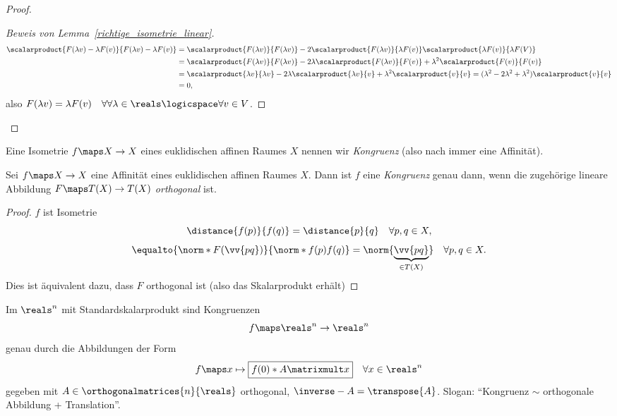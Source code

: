 \begin{proof}
\begin{proof}[Beweis von Lemma~\ref{richtige_isometrie_linear}]
    \begin{align*}
      \scalarproduct{F(\lambda v)-\lambda F(v)}{F(\lambda v)-\lambda F(v)}&=\scalarproduct{F(\lambda v)}{F(\lambda v)}-2\scalarproduct{F(\lambda v)}{\lambda F(v)}\scalarproduct{\lambda F(v)}{\lambda F(V)}\\
      &=\scalarproduct{F(\lambda v)}{F(\lambda v)}-2\lambda \scalarproduct{F(\lambda v)}{F(v)}+\lambda^2\scalarproduct{F(v)}{F(v)}\\
      &=\scalarproduct{\lambda v}{\lambda v}-2\lambda \scalarproduct{\lambda v}{v}+\lambda^2\scalarproduct{v}{v}=(\lambda^2-2\lambda^2+\lambda^2)\scalarproduct{v}{v}\\
      &=0,
    \end{align*}
    also \( F(\lambda v)=\lambda F(v)\quad  \forall \forall \lambda\in\reals\logicspace \forall v\in V \).
  \end{proof}
\end{proof}
\begin{definition*}
  Eine Isometrie \( f\maps X\to X \) eines euklidischen affinen Raumes \( X \) nennen wir \emph{Kongruenz} (also nach  immer eine Affinität).
\end{definition*}
\begin{lemma}
  Sei \( f\maps X\to X \) eine Affinität eines euklidischen affinen Raumes \( X \). Dann ist \( f \) eine \emph{Kongruenz} genau dann, wenn die zugehörige lineare Abbildung \( F\maps T(X)\to T(X) \) \emph{orthogonal} ist.
\end{lemma}
\begin{proof}
  \( f  \) ist Isometrie \gdw
  \begin{equation*}
    \distance{f(p)}{f(q)}=\distance{p}{q}\quad \forall p,q\in X,
  \end{equation*}
  \dh \gdw
  \begin{equation*}
    \equalto{\norm*{F(\vv{pq})}}{\norm*{f(p)f(q)}}=\norm{\underbrace{\vv{pq}}_{\in T(X)}} \quad \forall p,q\in X.
  \end{equation*}
  Dies ist äquivalent dazu, dass \( F \) orthogonal ist (also das Skalarprodukt erhält)
\end{proof}
\begin{bemerkung*}
  Im \( \reals^n \) mit Standardskalarprodukt sind Kongruenzen
  \begin{equation*}
    f\maps \reals^n\to \reals^n
  \end{equation*}
  genau durch die Abbildungen der Form
  \begin{equation*}
    f\maps x\mapsto \boxed{f(0)*A\matrixmult x}\quad \forall x\in \reals^n
  \end{equation*}
  gegeben mit \( A\in \orthogonalmatrices{n}{\reals} \) orthogonal, \dh \( \inverse-{A}=\transpose{A} \). Slogan: \enquote{Kongruenz \( \sim \) orthogonale Abbildung + Translation}.
\end{bemerkung*}
